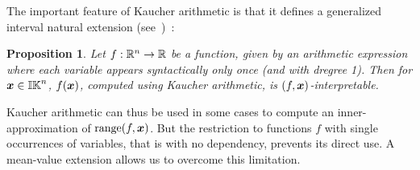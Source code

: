 \documentclass{sig-alternate-05-2015}
\newtheorem{proposition}{Proposition}
\DeclareMathOperator{\range}{range}
\def\bbr{{\Bbb R}}
\def\K{{\Bbb I \Bbb K}}
\begin{document}
The important feature of Kaucher arithmetic is that it defines a generalized interval natural extension (see~\cite{gold1})~:
\begin{proposition}
\label{prop1}
Let $f : \bbr^n \rightarrow \bbr$ be a function, given by an arithmetic expression where each variable appears syntactically only once (and with dregree 1).
Then for $\x \in \K^n$, $f(\x)$, computed using Kaucher arithmetic, is $(f,\x)$-interpretable.
\end{proposition}
Kaucher arithmetic can thus be used in some cases to compute an inner-approximation of $\range(f,\x)$.
But the restriction to functions $f$ with single occurrences of variables, 
that is with no dependency, prevents its direct use. A mean-value extension allows us to overcome this limitation.
\end{document}
